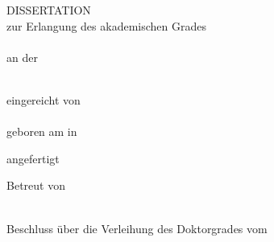 \begin{titlepage}
\begin{center}

\null
\vspace{\baselineskip}
{\huge {\bfseries \tTitle}} 
\vspace{5\baselineskip}
DISSERTATION \\
\vspace{\baselineskip}
zur Erlangung des akademischen Grades \\
\vspace{\baselineskip}
\tDegree \\
\vspace{\baselineskip}
an der\\ \vspace{.2\baselineskip}{\large \bf Medizinischen Fakultät der Universität Leipzig} \\
\vspace{6\baselineskip}

\vfill

    \noindent
    eingereicht von \\
    \vspace{.75\baselineskip}
    {\bf \tAuthor} \\
    \vspace{.25\baselineskip}
    geboren am \tBirthday{} in \tNativeTown \\

\vspace{3\baselineskip}

    \noindent
    angefertigt 
    \tDepartment \\

\vspace{1.5\baselineskip}

    \noindent
    Betreut von \\
    \vspace{.5\baselineskip}
    \tSupervisor \\

\vspace{1.5\baselineskip}

    \noindent
    Beschluss über die Verleihung des Doktorgrades vom \tDefenceDate

\end{center}
\restoregeometry
\end{titlepage}

